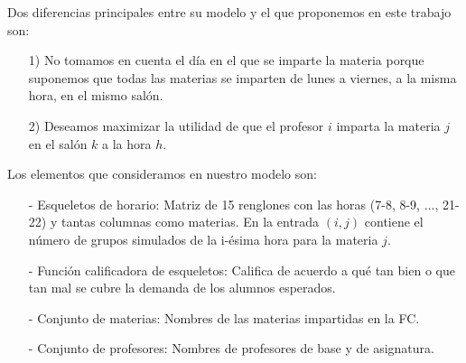 Dos diferencias principales entre su modelo y el que proponemos en este trabajo son:

\begin{enumerate}
\item[1)] No tomamos en cuenta el día en el que se imparte la materia porque suponemos que todas las materias se imparten de lunes a viernes, a la misma hora, en el mismo salón.

\item[2)] Deseamos maximizar la utilidad de que el profesor $i$ imparta la materia $j$ en el salón $k$ a la hora $h$.
\end{enumerate}


Los elementos que consideramos en nuestro modelo son:

\begin{itemize}
\item[-] Esqueletos de horario: Matriz de 15 renglones con las horas (7-8, 8-9, $\ldots$, 21-22) y tantas columnas como materias. En la entrada $(i,j)$ contiene el número de grupos simulados de la i-ésima hora para la materia $j$.

\item[-] Función calificadora de esqueletos: Califica de acuerdo a qué tan bien o que tan mal se cubre la demanda de los alumnos esperados.

\item[-] Conjunto de materias: Nombres de las materias impartidas en la FC.

\item[-] Conjunto de profesores: Nombres de profesores de base y de asignatura.
\end{itemize}

